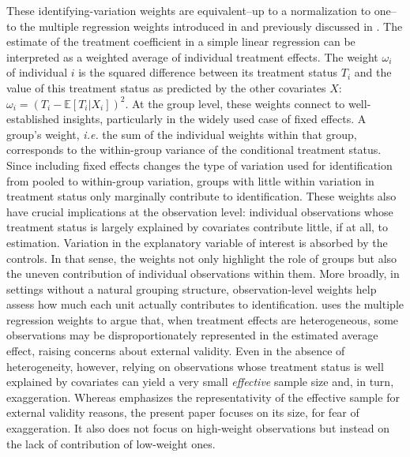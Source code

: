 \documentclass[usletter, 12pt]{article}
\begin{document}
				These identifying-variation weights are equivalent--up to a normalization to one--to the multiple regression weights introduced in \cite{aronow_does_2016} and previously discussed in \cite{angrist_mostly_2009}. %
				The estimate of the treatment coefficient in a simple linear regression can be interpreted as a weighted average of individual treatment effects. The weight $\omega_{i}$ of individual $i$ is the squared difference between its treatment status $T_{i}$ and the value of this treatment status as predicted by the other covariates $X$: $\omega_{i} = (T_{i} - \mathbb{E}[T_{i} | X_{i}])^{2}$. %
				At the group level, these weights connect to well-established insights, particularly in the widely used case of fixed effects. A group’s weight, \textit{i.e.} the sum of the individual weights within that group, corresponds to the within-group variance of the conditional treatment status. Since including fixed effects changes the type of variation used for identification from pooled to within-group variation, groups with little within variation in treatment status only marginally contribute to identification. 
				These weights also have crucial implications at the observation level: individual observations whose treatment status is largely explained by covariates contribute little, if at all, to estimation. Variation in the explanatory variable of interest is absorbed by the controls. In that sense, the weights not only highlight the role of groups but also the uneven contribution of individual observations within them. More broadly, in settings without a natural grouping structure, observation-level weights help assess how much each unit actually contributes to identification. 
				\cite{aronow_does_2016} uses the multiple regression weights to argue that, when treatment effects are heterogeneous, some observations may be disproportionately represented in the estimated average effect, raising concerns about external validity. Even in the absence of heterogeneity, however, relying on observations whose treatment status is well explained by covariates can yield a very small \textit{effective} sample size and, in turn, exaggeration. Whereas \cite{aronow_does_2016} emphasizes the representativity of the effective sample for external validity reasons, the present paper focuses on its size, for fear of exaggeration. It also does not focus on high-weight observations but instead on the lack of contribution of low-weight ones. 
			
\end{document}
